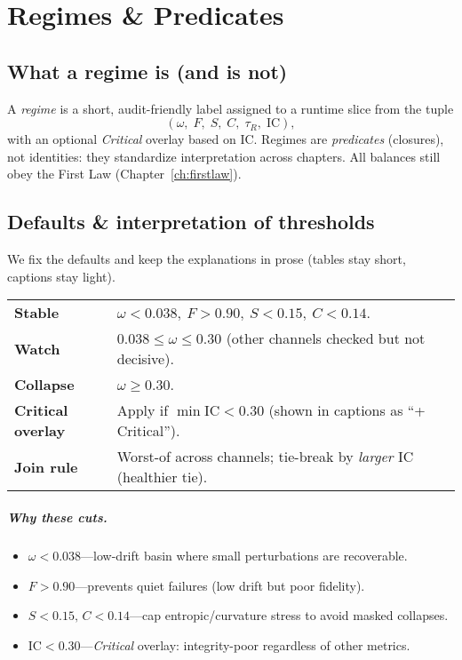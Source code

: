 \chapter{Regimes \& Predicates}
\label{ch:regimes}

\section{What a regime is (and is not)}
A \emph{regime} is a short, audit-friendly label assigned to a runtime slice from the tuple
\[
(\omega,\;F,\;S,\;C,\;\tau_{R},\;\mathrm{IC}),
\]
with an optional \emph{Critical} overlay based on $\mathrm{IC}$. Regimes are \emph{predicates} (closures), not identities: they standardize interpretation across chapters. All balances still obey the First Law (Chapter~\ref{ch:firstlaw}).

\section{Defaults \& interpretation of thresholds}
We fix the defaults and keep the explanations in prose (tables stay short, captions stay light).

\begin{eqbox}
\small
\begin{tabularx}{\linewidth}{@{}>{\bfseries}l X@{}}
Stable   & $\omega<0.038,\ F>0.90,\ S<0.15,\ C<0.14$. \\
Watch    & $0.038\le \omega \le 0.30$ (other channels checked but not decisive). \\
Collapse & $\omega\ge 0.30$. \\
Critical overlay & Apply if $\min\mathrm{IC}<0.30$ (shown in captions as “+ Critical”). \\
Join rule & Worst-of across channels; tie-break by \emph{larger} $\mathrm{IC}$ (healthier tie). \\
\end{tabularx}
\end{eqbox}

\paragraph{Why these cuts.}
\begin{itemize}[leftmargin=1.8em]
  \item $\omega<0.038$—low-drift basin where small perturbations are recoverable.
  \item $F>0.90$—prevents quiet failures (low drift but poor fidelity).
  \item $S<0.15,\, C<0.14$—cap entropic/curvature stress to avoid masked collapses.
  \item $\mathrm{IC}<0.30$—\emph{Critical} overlay: integrity-poor regardless of other metrics.
\end{itemize}

